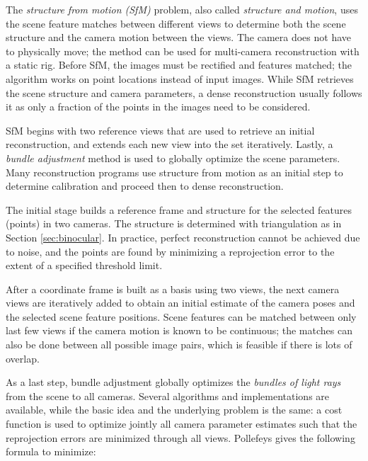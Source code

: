 The \emph{structure from motion (SfM)} problem, also called \emph{structure and motion}, uses the scene feature matches between different views to determine both the scene structure and the camera motion between the views.
\cite{snavely2006photo,fitzgibbon1998automatic,pollefeys2004visual}
The camera does not have to physically move; the method can be used for multi-camera reconstruction with a static rig.
Before SfM, the images must be rectified and features matched; the algorithm works on point locations instead of input images.
While SfM retrieves the scene structure and camera parameters, a dense reconstruction usually follows it as only a fraction of the points in the images need to be considered.
\cite{pollefeys2004visual}

SfM begins with two reference views that are used to retrieve an initial reconstruction, and extends each new view into the set iteratively.
Lastly, a \emph{bundle adjustment} method is used to globally optimize the scene parameters. \cite{triggs2000bundle}
Many reconstruction programs use structure from motion as an initial step to determine calibration and proceed then to dense reconstruction.

The initial stage builds a reference frame and structure for the selected features (points) in two cameras.
The structure is determined with triangulation as in Section \ref{sec:binocular}.
In practice, perfect reconstruction cannot be achieved due to noise, and the points are found by minimizing a reprojection error to the extent of a specified threshold limit.

After a coordinate frame is built as a basis using two views, the next camera views are iteratively added to obtain an initial estimate of the camera poses and the selected scene feature positions.
Scene features can be matched between only last few views if the camera motion is known to be continuous;
the matches can also be done between all possible image pairs, which is feasible if there is lots of overlap.

As a last step, bundle adjustment globally optimizes the \emph{bundles of light rays} from the scene to all cameras.
Several algorithms and implementations are available, while the basic idea and the underlying problem is the same:
a cost function is used to optimize jointly all camera parameter estimates such that the reprojection errors are minimized through all views.
Pollefeys \cite{pollefeys2004visual} gives the following formula to minimize:

